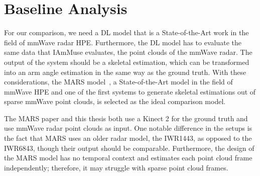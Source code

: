 
\section{Baseline Analysis}
\label{section: experimental setup - baseline analysis}

For our comparison, we need a DL model that is a State-of-the-Art work in the field of mmWave radar HPE.
Furthermore, the DL model has to evaluate the same data that IAmMuse evaluates, the point clouds of the mmWave radar.
The output of the system should be a skeletal estimation, which can be transformed into an arm angle estimation in the same way as the ground truth.
With these considerations, the MARS model~\cite{an2021mars}, a State-of-the-Art model in the field of mmWave HPE and one of the first systems to generate skeletal estimations out of sparse mmWave point clouds, is selected as the ideal comparison model.

The MARS paper and this thesis both use a Kinect 2 for the ground truth and use mmWave radar point clouds as input.
One notable difference in the setups is the fact that MARS uses an older radar model, the IWR1443, as opposed to the IWR6843, though their output should be comparable.
Furthermore, the design of the MARS model has no temporal context and estimates each point cloud frame independently; therefore, it may struggle with sparse point cloud frames.


